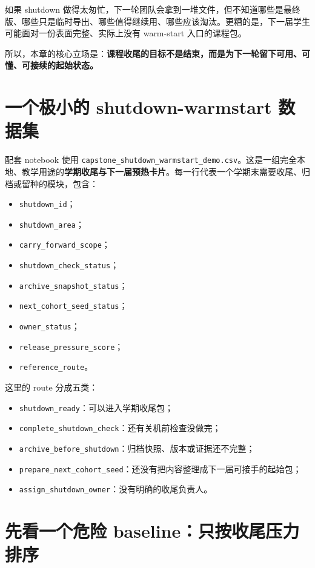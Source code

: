 如果 shutdown 做得太匆忙，下一轮团队会拿到一堆文件，但不知道哪些是最终版、哪些只是临时导出、哪些值得继续用、哪些应该淘汰。更糟的是，下一届学生可能面对一份表面完整、实际上没有 warm-start 入口的课程包。

所以，本章的核心立场是：\textbf{课程收尾的目标不是结束，而是为下一轮留下可用、可懂、可接续的起始状态。}

\section{一个极小的 shutdown-warmstart 数据集}

配套 notebook 使用 \nolinkurl{capstone_shutdown_warmstart_demo.csv}。这是一组完全本地、教学用途的\textbf{学期收尾与下一届预热卡片}。每一行代表一个学期末需要收尾、归档或留种的模块，包含：

\begin{itemize}
    \item \texttt{shutdown\_id}；
    \item \texttt{shutdown\_area}；
    \item \texttt{carry\_forward\_scope}；
    \item \texttt{shutdown\_check\_status}；
    \item \texttt{archive\_snapshot\_status}；
    \item \texttt{next\_cohort\_seed\_status}；
    \item \texttt{owner\_status}；
    \item \texttt{release\_pressure\_score}；
    \item \texttt{reference\_route}。
\end{itemize}

这里的 route 分成五类：

\begin{itemize}
    \item \texttt{shutdown\_ready}：可以进入学期收尾包；
    \item \texttt{complete\_shutdown\_check}：还有关机前检查没做完；
    \item \texttt{archive\_before\_shutdown}：归档快照、版本或证据还不完整；
    \item \texttt{prepare\_next\_cohort\_seed}：还没有把内容整理成下一届可接手的起始包；
    \item \texttt{assign\_shutdown\_owner}：没有明确的收尾负责人。
\end{itemize}

\section{先看一个危险 baseline：只按收尾压力排序}

